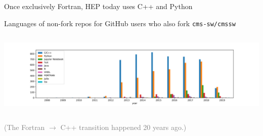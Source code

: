 \documentclass[aspectratio=169]{beamer}
\begin{document}
\begin{frame}{Once exclusively Fortran, HEP today uses C++ and Python}
\large
\vspace{0.5 cm}
\begin{center}
Languages of non-fork repos for GitHub users who also fork {\tt cms-sw/cmssw}
\end{center}

\vspace{-0.25 cm}
\begin{columns}
\mbox{\hspace{-1 cm}\includegraphics[width=\linewidth]{physicist-github-languages-lin.pdf}}
\end{columns}

\begin{center}
\textcolor{gray}{(The Fortran $\to$ C++ transition happened 20 years ago.)}
\end{center}
\end{frame}







\end{document}
